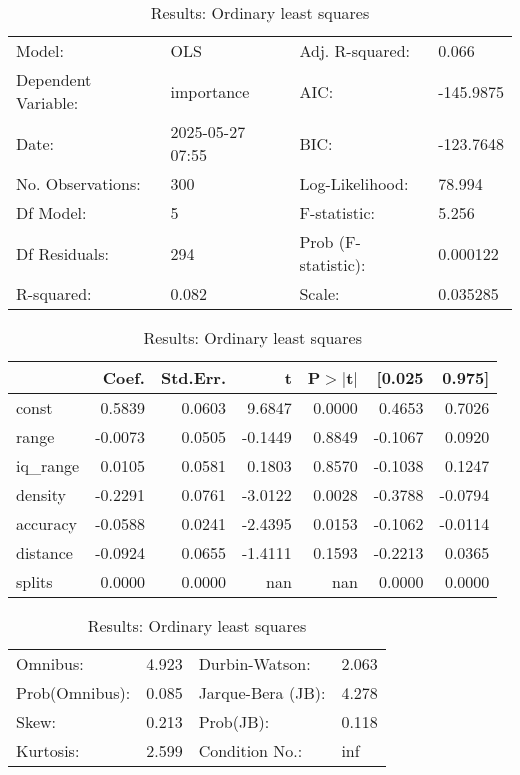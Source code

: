 \begin{table}
\caption{Results: Ordinary least squares}
\label{}
\begin{center}
\begin{tabular}{llll}
\hline
Model:              & OLS              & Adj. R-squared:     & 0.066      \\
Dependent Variable: & importance       & AIC:                & -145.9875  \\
Date:               & 2025-05-27 07:55 & BIC:                & -123.7648  \\
No. Observations:   & 300              & Log-Likelihood:     & 78.994     \\
Df Model:           & 5                & F-statistic:        & 5.256      \\
Df Residuals:       & 294              & Prob (F-statistic): & 0.000122   \\
R-squared:          & 0.082            & Scale:              & 0.035285   \\
\hline
\end{tabular}
\end{center}

\begin{center}
\begin{tabular}{lrrrrrr}
\hline
          &   Coef. & Std.Err. &       t & P$> |$t$|$ &  [0.025 &  0.975]  \\
\hline
const     &  0.5839 &   0.0603 &  9.6847 &      0.0000 &  0.4653 &  0.7026  \\
range     & -0.0073 &   0.0505 & -0.1449 &      0.8849 & -0.1067 &  0.0920  \\
iq\_range &  0.0105 &   0.0581 &  0.1803 &      0.8570 & -0.1038 &  0.1247  \\
density   & -0.2291 &   0.0761 & -3.0122 &      0.0028 & -0.3788 & -0.0794  \\
accuracy  & -0.0588 &   0.0241 & -2.4395 &      0.0153 & -0.1062 & -0.0114  \\
distance  & -0.0924 &   0.0655 & -1.4111 &      0.1593 & -0.2213 &  0.0365  \\
splits    &  0.0000 &   0.0000 &     nan &         nan &  0.0000 &  0.0000  \\
\hline
\end{tabular}
\end{center}

\begin{center}
\begin{tabular}{llll}
\hline
Omnibus:       & 4.923 & Durbin-Watson:    & 2.063  \\
Prob(Omnibus): & 0.085 & Jarque-Bera (JB): & 4.278  \\
Skew:          & 0.213 & Prob(JB):         & 0.118  \\
Kurtosis:      & 2.599 & Condition No.:    & inf    \\
\hline
\end{tabular}
\end{center}
\end{table}
